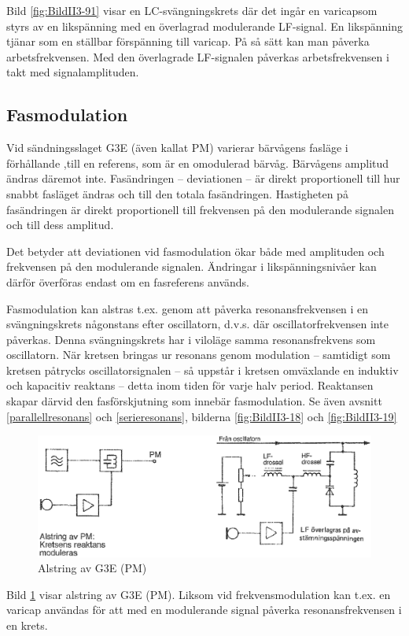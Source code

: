 Bild \ref{fig:BildII3-91} visar en LC-svängningskrets där det ingår en
varicapsom styrs av en likspänning med en överlagrad modulerande LF-signal.
En likspänning tjänar som en ställbar förspänning till varicap.
På så sätt kan man påverka arbetsfrekvensen.
Med den överlagrade LF-signalen påverkas arbetsfrekvensen i takt med
signalamplituden.

\subsection{Fasmodulation}

Vid sändningsslaget G3E (även kallat PM) varierar bärvågens fasläge i
förhållande ,till en referens, som är en omodulerad bärvåg.
Bärvågens amplitud ändras däremot inte.
Fasändringen -- deviationen -- är direkt proportionell till hur snabbt fasläget
ändras och till den totala fasändringen.
Hastigheten på fasändringen är direkt proportionell till frekvensen på den
modulerande signalen och till dess amplitud.

Det betyder att deviationen vid fasmodulation ökar både med amplituden
och frekvensen på den modulerande signalen.
Ändringar i likspänningsnivåer kan därför överföras endast om en fasreferens
används.

Fasmodulation kan alstras t.ex. genom att påverka resonansfrekvensen i
en svängningskrets någonstans efter oscillatorn, d.v.s. där
oscillatorfrekvensen inte påverkas.
Denna svängningskrets har i viloläge samma resonansfrekvens som oscillatorn.
När kretsen bringas ur resonans genom modulation -- samtidigt som kretsen
påtrycks oscillatorsignalen -- så uppstår i kretsen omväxlande en induktiv och
kapacitiv reaktans -- detta inom tiden för varje halv period.
Reaktansen skapar därvid den fasförskjutning som innebär fasmodulation.
Se även avsnitt \ref{parallellresonans} och \ref{serieresonans}, bilderna
\ref{fig:BildII3-18} och \ref{fig:BildII3-19}

\begin{figure}
\includegraphics[width=\textwidth]{images/cropped_pdfs/bild_2_3-92.pdf}
\caption{Alstring av G3E (PM)}
\label{fig:BildII3-92}
\end{figure}

Bild \ref{fig:BildII3-92} visar alstring av G3E (PM).
Liksom vid frekvensmodulation kan t.ex. en varicap användas för att
med en modulerande signal påverka resonansfrekvensen i en krets.
